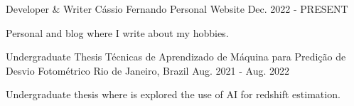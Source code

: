 

\begin{cventries}

  \cventry
    {Developer \& Writer} %
    {Cássio Fernando} %
    {Personal Website} %
    {Dec. 2022 - PRESENT} %
    {
      \begin{cvitems} %
        \item {Personal and blog where I write about my hobbies.}
      \end{cvitems}
    }

  \cventry
    {Undergraduate Thesis} %
    {Técnicas de Aprendizado de Máquina para Predição de Desvio Fotométrico} %
    {Rio de Janeiro, Brazil} %
    {Aug. 2021 - Aug. 2022} %
    {
      \begin{cvitems} %
        \item {Undergraduate thesis where is explored the use of AI for redshift estimation.}
      \end{cvitems}
    }

\end{cventries}
